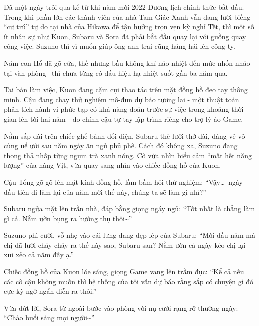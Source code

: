 \documentclass[../main.tex]{subfiles}
\begin{document}

Đã một ngày trôi qua kể từ khi năm mới 2022 Dương lịch chính thức bắt đầu. Trong khi phần lớn các thành viên của nhà Tam Giác Xanh vẫn đang lười biếng ``cư trú'' tự do tại nhà của Hikawa để tận hưởng trọn vẹn kỳ nghỉ Tết, thì một số ít nhân sự như Kuon, Subaru và Sora đã phải bắt đầu quay lại với guồng quay công việc. Suzuno thì vì muốn giúp ông anh trai cũng hăng hái lên công ty.

Năm con Hổ đã gõ cửa, thế nhưng bầu không khí náo nhiệt đến mức nhốn nháo tại văn phòng \hll\ thì chưa từng có dấu hiệu hạ nhiệt suốt gần ba năm qua.

Tại bàn làm việc, Kuon đang cặm cụi thao tác trên mặt đồng hồ đeo tay thông minh. Cậu đang chạy thử nghiệm mô-đun dự báo tương lai - một thuật toán phân tích hành vi phức tạp có khả năng đoán trước sự việc trong khoảng thời gian lên tới hai năm - do chính cậu tự tay lập trình riêng cho trợ lý ảo Game.

Nằm sấp dài trên chiếc ghế bành đối diện, Subaru thè lưỡi thở dài, dáng vẻ vô cùng uể ưới sau năm ngày ăn ngủ phủ phê. Cách đó không xa, Suzuno đang thong thả nhấp từng ngụm trà xanh nóng. Cô vừa nhìn biểu cảm ``mất hết năng lượng'' của nàng Vịt, vừa quay sang nhìn vào chiếc đồng hồ của Kuon.

Cậu Tổng gõ gõ lên mặt kính đồng hồ, lầm bầm hỏi thử nghiệm: ``Vậy\dots\ ngày đầu tiên đi làm lại của năm mới thế này, chúng ta sẽ làm gì nhỉ?''

Subaru ngửa mặt lên trần nhà, đáp bằng giọng ngáy ngủ: ``Tốt nhất là chẳng làm gì cả. Nằm ưỡn bụng ra hưởng thụ thôi\~{}''

Suzuno phì cười, vỗ nhẹ vào cái lưng đang dẹp lép của Subaru: ``Mới đầu năm mà chị đã lười chảy chảy ra thế này sao, Subaru-san? Nằm ườn cả ngày kẻo chị lại xui xẻo cả năm đấy ạ.''

Chiếc đồng hồ của Kuon lóe sáng, giọng Game vang lên trầm đục: ``Kể cả nếu các cô cậu không muốn thì hệ thống của tôi vẫn dự báo rằng sắp có chuyện gì đó cực kỳ ngớ ngẩn diễn ra thôi.''

Vừa dứt lời, Sora từ ngoài bước vào phòng với nụ cười rạng rỡ thường ngày: ``Chào buổi sáng mọi người\~{}''
\end{document}
